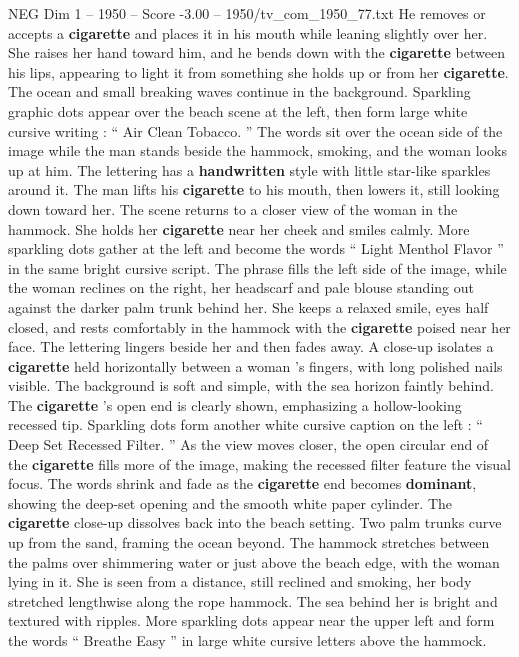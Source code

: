 \begin{textsample}{NEG Dim 1 – 1950 – Score -3.00 – 1950/tv\_com\_1950\_77.txt}
He removes or accepts a \textbf{cigarette} and places it in his mouth while leaning slightly over her.
She raises her hand toward him, and he bends down with the \textbf{cigarette} between his lips, appearing to light it from something she holds up or from her \textbf{cigarette}.
The ocean and small breaking waves continue in the background.
Sparkling graphic dots appear over the beach scene at the left, then form large white cursive writing : “ Air Clean Tobacco. ” The words sit over the ocean side of the image while the man stands beside the hammock, smoking, and the woman looks up at him.
The lettering has a \textbf{handwritten} style with little star-like sparkles around it.
The man lifts his \textbf{cigarette} to his mouth, then lowers it, still looking down toward her.
The scene returns to a closer view of the woman in the hammock.
She holds her \textbf{cigarette} near her cheek and smiles calmly.
More sparkling dots gather at the left and become the words “ Light Menthol Flavor ” in the same bright cursive script.
The phrase fills the left side of the image, while the woman reclines on the right, her headscarf and pale blouse standing out against the darker palm trunk behind her.
She keeps a relaxed smile, eyes half closed, and rests comfortably in the hammock with the \textbf{cigarette} poised near her face.
The lettering lingers beside her and then fades away.
A close-up isolates a \textbf{cigarette} held horizontally between a woman ’s fingers, with long polished nails visible.
The background is soft and simple, with the sea horizon faintly behind.
The \textbf{cigarette} ’s open end is clearly shown, emphasizing a hollow-looking recessed tip.
Sparkling dots form another white cursive caption on the left : “ Deep Set Recessed Filter. ” As the view moves closer, the open circular end of the \textbf{cigarette} fills more of the image, making the recessed filter feature the visual focus.
The words shrink and fade as the \textbf{cigarette} end becomes \textbf{dominant}, showing the deep-set opening and the smooth white paper cylinder.
The \textbf{cigarette} close-up dissolves back into the beach setting.
Two palm trunks curve up from the sand, framing the ocean beyond.
The hammock stretches between the palms over shimmering water or just above the beach edge, with the woman lying in it.
She is seen from a distance, still reclined and smoking, her body stretched lengthwise along the rope hammock.
The sea behind her is bright and textured with ripples.
More sparkling dots appear near the upper left and form the words “ Breathe Easy ” in large white cursive letters above the hammock.

\end{textsample}
